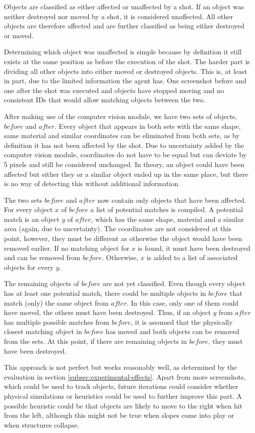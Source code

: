 Objects are classified as either affected or unaffected by a shot.
If an object was neither destroyed nor moved by a shot, it is considered unaffected.
All other objects are therefore affected and are further classified as being either destroyed or moved.

Determining which object was unaffected is simple because by definition it still exists at the same position as before the execution of the shot.
The harder part is dividing all other objects into either moved or destroyed objects.
This is, at least in part, due to the limited information the agent has. 
One screenshot before and one after the shot was executed and objects have stopped moving and no consistent IDs that would allow matching objects between the two.

After making use of the computer vision module, we have two sets of objects, $before$ and $after$. Every object that appears in both sets with the same shape, same material and similar coordinates can be eliminated from both sets, as by definition it has not been affected by the shot.
Due to uncertainty added by the computer vision module, coordinates do not have to be equal but can deviate by 5 pixels and still be considered unchanged.
In theory, an object could have been affected but either they or a similar object ended up in the same place, but there is no way of detecting this without additional information.

The two sets $before$ and $after$ now contain only objects that have been affected.
For every object $x$ of $before$ a list of potential matches is compiled. A potential match is an object $y$ of $after$, which has the same shape, material and a similar area (again, due to uncertainty). The coordinates are not considered at this point, however, they must be different as otherwise the object would have been removed earlier.
If no matching object for $x$ is found, it must have been destroyed and can be removed from $before$. Otherwise, $x$ is added to a list of associated objects for every $y$.

The remaining objects of $before$ are not yet classified. Even though every object has at least one potential match, there could be multiple objects in $before$ that match (only) the same object from $after$. 
In this case, only one of them could have moved, the others must have been destroyed. Thus, if an object $y$ from $after$ has multiple possible matches from $before$, it is assumed that the physically closest matching object in $before$ has moved and both objects can be removed from the sets. 
At this point, if there are remaining objects in $before$, they must have been destroyed.

This approach is not perfect but works reasonably well, as determined by the evaluation in section \ref{subsec:experimental-effects}. Apart from more screenshots, which could be used to track objects, future iterations could consider whether physical simulations or heuristics could be used to further improve this part.
A possible heuristic could be that objects are likely to move to the right when hit from the left, although this might not be true when slopes come into play or when structures collapse.
